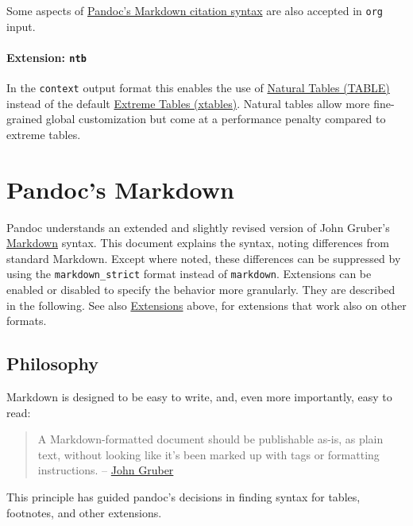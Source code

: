 \documentclass[]{article}
\begin{document}
Some aspects of \protect\hyperlink{citations}{Pandoc's Markdown citation
syntax} are also accepted in \texttt{org} input.

\hypertarget{extension-ntb}{%
\paragraph{\texorpdfstring{Extension:
\texttt{ntb}}{Extension: ntb}}\label{extension-ntb}}

In the \texttt{context} output format this enables the use of
\href{https://wiki.contextgarden.net/TABLE}{Natural Tables (TABLE)}
instead of the default
\href{https://wiki.contextgarden.net/xtables}{Extreme Tables (xtables)}.
Natural tables allow more fine-grained global customization but come at
a performance penalty compared to extreme tables.

\hypertarget{pandocs-markdown}{%
\section{Pandoc's Markdown}\label{pandocs-markdown}}

Pandoc understands an extended and slightly revised version of John
Gruber's \href{https://daringfireball.net/projects/markdown/}{Markdown}
syntax. This document explains the syntax, noting differences from
standard Markdown. Except where noted, these differences can be
suppressed by using the \texttt{markdown\_strict} format instead of
\texttt{markdown}. Extensions can be enabled or disabled to specify the
behavior more granularly. They are described in the following. See also
\protect\hyperlink{extensions}{Extensions} above, for extensions that
work also on other formats.

\hypertarget{philosophy}{%
\subsection{Philosophy}\label{philosophy}}

Markdown is designed to be easy to write, and, even more importantly,
easy to read:

\begin{quote}
A Markdown-formatted document should be publishable as-is, as plain
text, without looking like it's been marked up with tags or formatting
instructions. --
\href{https://daringfireball.net/projects/markdown/syntax\#philosophy}{John
Gruber}
\end{quote}

This principle has guided pandoc's decisions in finding syntax for
tables, footnotes, and other extensions.
\end{document}
